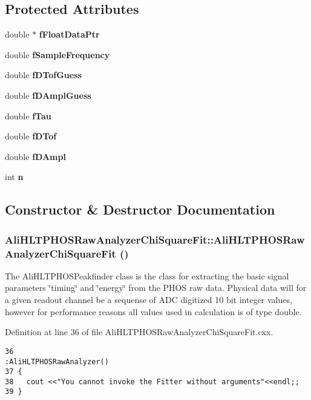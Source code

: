 \subsection*{Protected Attributes}
\begin{CompactItemize}
\item 
double $\ast$ {\bf f\-Float\-Data\-Ptr}
\item 
double {\bf f\-Sample\-Frequency}
\item 
double {\bf f\-DTof\-Guess}
\item 
double {\bf f\-DAmpl\-Guess}
\item 
double {\bf f\-Tau}
\item 
double {\bf f\-DTof}
\item 
double {\bf f\-DAmpl}
\item 
int {\bf n}
\end{CompactItemize}


\subsection{Constructor \& Destructor Documentation}
\subsubsection{\setlength{\rightskip}{0pt plus 5cm}Ali\-HLTPHOSRaw\-Analyzer\-Chi\-Square\-Fit::Ali\-HLTPHOSRaw\-Analyzer\-Chi\-Square\-Fit ()}\label{classAliHLTPHOSRawAnalyzerChiSquareFit_AliHLTPHOSRawAnalyzerChiSquareFita0}


The Ali\-HLTPHOSPeakfinder class is the class for extracting the basic signal parameters \char`\"{}timing\char`\"{} and \char`\"{}energy\char`\"{} from the PHOS raw data. Physical data will for a given readout channel be a sequense of ADC digitized 10 bit integer values, however for performance reasons all values used in calculation is of type double. 

Definition at line 36 of file Ali\-HLTPHOSRaw\-Analyzer\-Chi\-Square\-Fit.cxx.

\footnotesize\begin{verbatim}36                                                                     :AliHLTPHOSRawAnalyzer()
37 {
38   cout <<"You cannot invoke the Fitter without arguments"<<endl;;
39 }
\end{verbatim}\normalsize 


